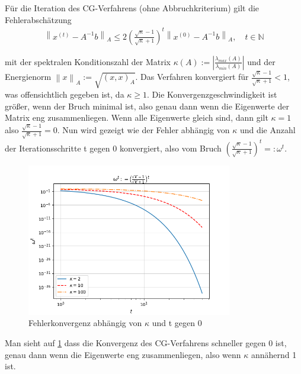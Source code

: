 \documentclass[12pt,a4paper]{scrartcl}
\numberwithin{equation}{section}
\numberwithin{myalgctr}{section}
\numberwithin{mytheoremctr}{subsection}
\numberwithin{mykorollarctr}{subsection}
\numberwithin{mylemmactr}{subsection}
\numberwithin{mybeispielctr}{subsection}
\newcommand\norm[1]{\left\lVert#1\right\rVert}
\begin{document}
	
	Für die Iteration des CG-Verfahrens (ohne Abbruchkriterium) gilt die Fehlerabschätzung \autocite[vgl.][102]{skript}
	\begin{align*}
		\norm{x^{(t)} - A^{-1}b}_A \leq 2\left(\frac{\sqrt{\kappa} - 1}{\sqrt{\kappa} + 1}\right)^{t}\norm{x^{(0)} - A^{-1}b}_A, \quad t\in\mathbb{N}
	\end{align*}
	
	mit der spektralen Konditionszahl der Matrix $\kappa(A) := \left|\frac{\lambda_{max}(A)}{\lambda_{min}(A)}\right|$ und der Energienorm $\norm{x}_A := \sqrt{(x,x)_A}$. Das Verfahren konvergiert für $\frac{\sqrt{\kappa} - 1}{\sqrt{\kappa} + 1} < 1$, was offensichtlich gegeben ist, da $\kappa \geq 1$. Die Konvergenzgeschwindigkeit ist größer, wenn der Bruch minimal ist, also genau dann wenn die Eigenwerte der Matrix eng zusammenliegen. Wenn alle Eigenwerte gleich sind, dann gilt $\kappa = 1$ also $\frac{\sqrt{\kappa} - 1}{\sqrt{\kappa} + 1} = 0$. Nun wird gezeigt wie der Fehler abhängig von $\kappa$ und die Anzahl der Iterationsschritte t gegen 0 konvergiert, also vom Bruch $\left(\frac{\sqrt{\kappa} - 1}{\sqrt{\kappa} + 1}\right)^{t} =: \omega^{t}$.
	
	\begin{figure}[H]
		\begin{center}
			\includegraphics[width=0.8\textwidth]{../plots/fehler-cgloglog.png}
		\end{center}
		\caption{Fehlerkonvergenz abhängig von $\kappa$ und t gegen 0}
		\label{fig:fehlercg}	
	\end{figure}

	Man sieht auf \cref{fig:fehlercg} dass die Konvergenz des CG-Verfahrens schneller gegen 0 ist, genau dann wenn die Eigenwerte eng zusammenliegen, also wenn $\kappa$ annähernd 1 ist.
	
\end{document}
